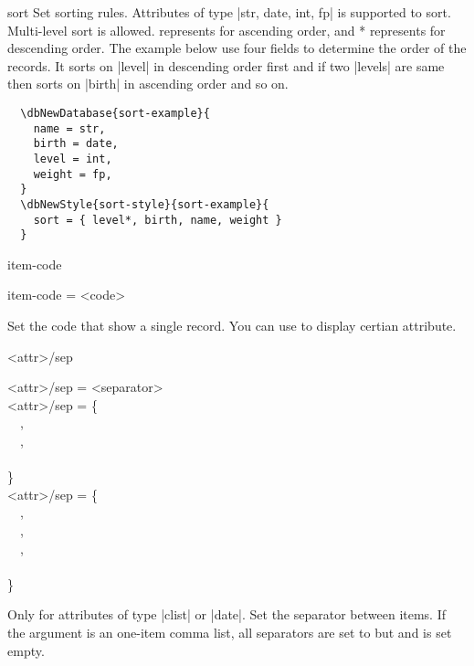 \documentclass[full]{l3doc}
\begin{document}
\begin{documentation}
\begin{option}[added=2022-01-05]{sort}
  Set sorting rules. Attributes of type |str, date, int, fp| is supported to
  sort.  Multi-level sort is allowed.  represents for ascending
  order, and * represents for descending order. The example below
  use four fields to determine the order of the records. It sorts on |level|
  in descending order first and if two |levels| are same then sorts on |birth|
  in ascending order and so on.
\end{option}

\begin{verbatim}
  \dbNewDatabase{sort-example}{
    name = str,
    birth = date,
    level = int,
    weight = fp,
  }
  \dbNewStyle{sort-style}{sort-example}{
    sort = { level*, birth, name, weight }
  }
\end{verbatim}

\begin{option}[added=2022-01-05, rEXP]{item-code}
  \begin{syntax}
    item-code = <code>
  \end{syntax}

  Set the code that show a single record. You can use  to display
  certian attribute.
\end{option}

\begin{option}[added=2022-01-05, updated=2022-01-08, rEXP]{<attr>/sep}
  \begin{syntax}
    <attr>/sep = <separator> \\
    <attr>/sep = \{ \\
    ~~, \\
    ~~, \\
    ~~ \\
    \} \\
    <attr>/sep = \{ \\
    ~~, \\
    ~~, \\
    ~~, \\
    ~~ \\
    \} \\
  \end{syntax}

  Only for attributes of type |clist| or |date|. Set the separator between
  items. If the argument is an one-item comma list, all separators are set to
   but  and  is set empty.
\end{option}


\end{documentation}
\end{document}
